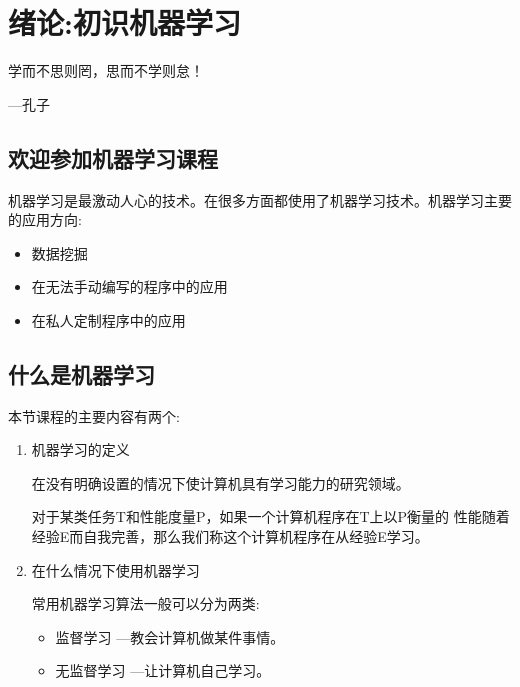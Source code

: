 \chapter{绪论:初识机器学习}

\begin{center}
学而不思则罔，思而不学则怠！
\end{center}

\begin{flushright}
---孔子    
\end{flushright}

\section{欢迎参加机器学习课程}
机器学习是最激动人心的技术。在很多方面都使用了机器学习技术。机器学习主要的应用方向:
\begin{itemize}
\itemsep=3pt
\parskip=0pt
\item 数据挖掘
\item 在无法手动编写的程序中的应用
\item 在私人定制程序中的应用
\end{itemize} 

\section{什么是机器学习}

本节课程的主要内容有两个:
\begin{enumerate}[1)]
\item 机器学习的定义
\begin{newdef}
\large 在没有明确设置的情况下使计算机具有学习能力的研究领域。
\end{newdef}

\begin{newdef}
\large 对于某类任务T和性能度量P，如果一个计算机程序在T上以P衡量的
性能随着经验E而自我完善，那么我们称这个计算机程序在从经验E学习。\cite{MachineLearning}
\end{newdef}
\item 在什么情况下使用机器学习

常用机器学习算法一般可以分为两类:
\begin{itemize}
\item 监督学习{\color{red} ---教会计算机做某件事情。}
\item 无监督学习{\color{red} ---让计算机自己学习。}
\end{itemize}

\end{enumerate}

